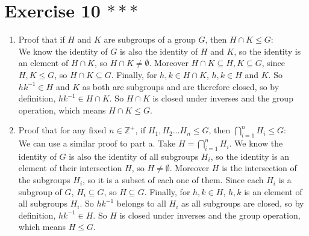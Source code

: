 \documentclass[12pt]{article}
\newcommand{\Z}{\mathbb{Z}}
\begin{document}
    \section*{Exercise 10 $***$}
    \begin{enumerate}[label=\textbf{\alph*.}]
        \item 
            Proof that if $H$ and $K$ are subgroups of a group $G$,
            then $H \cap K \leqslant G$: \\
            We know the identity of $G$ is also the identity of $H$ and $K$,
            so the identity is an element of $H \cap K$,
            so $H \cap K \neq \emptyset$.
            Moreover $H \cap K \subseteq H, K \subseteq G$,
            since $H, K \leqslant G$,
            so $H \cap K \subseteq G$.
            Finally, for $h, k \in H \cap K$,
            $h, k \in H$ and $K$.
            So $hk^{-1} \in H$ and $K$
            as both are subgroups and are therefore closed,
            so by definition, $hk^{-1} \in H \cap K$.
            So $H \cap K$ is closed under inverses and the group operation,
            which means $H \cap K \leqslant G$.
        \item
            Proof that for any fixed $n \in \Z^+$,
            if $H_1, H_2 ... H_n \leqslant G$,
            then $\bigcap_{i = 1}^n H_i \leqslant G$: \\
            We can use a similar proof to part a.
            Take $H = \bigcap_{i = 1}^n H_i$.
            We know the identity of $G$ is also the identity of all 
            subgroups $H_i$,
            so the identity is an element of their intersection $H$,
            so $H \neq \emptyset$.
            Moreover $H$ is the intersection of the subgroups $H_i$,
            so it is a subset of each one of them.
            Since each $H_i$ is a subgroup of $G$, $H_i\subseteq G$,
            so $H \subseteq G$.
            Finally, for $h, k \in H$,
            $h, k$ is an element of all subgroups $H_i$.
            So $hk^{-1}$ belongs to all $H_i$
            as all subgroups are closed,
            so by definition, $hk^{-1} \in H$.
            So $H$ is closed under inverses and the group operation,
            which means $H \leqslant G$.
    \end{enumerate}
\end{document}

